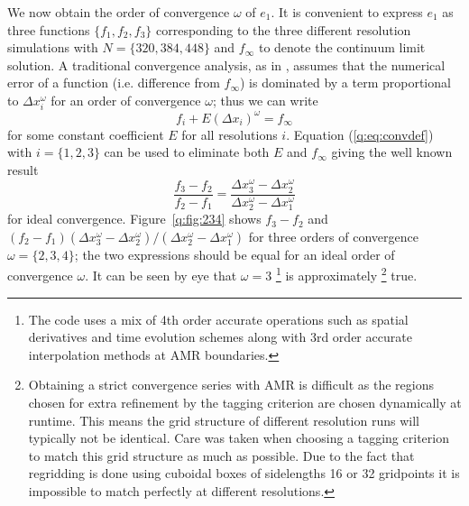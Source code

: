 We now obtain the order of convergence $\omega$ of $e_1$. It is convenient to express $e_1$ as three functions $\{f_1,f_2,f_3\}$ corresponding to the three different resolution simulations with $N=\{320,384,448\}$ and $f_\infty$ to denote the continuum limit solution. A traditional convergence analysis, as in \cite{PresTeukVettFlan92}, assumes that the numerical error of a function (i.e. difference from $f_\infty$) is dominated by a term proportional to $\Delta x_i^\omega$ for an order of convergence $\omega$; thus we can write
\begin{equation}\label{q:eq:convdef}f_i + E (\Delta x_i)^\omega = f_\infty\end{equation}
for some constant coefficient $E$ for all resolutions $i$. Equation (\ref{q:eq:convdef}) with $i=\{1,2,3\}$ can be used to eliminate both $E$ and $f_\infty$ giving the well known result
\begin{equation}
\label{q:eq:trad_conv_def}\frac{f_3-f_2}{f_2-f_1} = \frac{ \Delta x_3^\omega-\Delta x_2^\omega }{ \Delta x_2^\omega-\Delta x_1^\omega }
\end{equation}
for ideal convergence. Figure~\ref{q:fig:234} shows $f_3-f_2$ and
$(f_2-f_1 )(\Delta x_3^\omega - \Delta x_2^\omega)/(\Delta x_2^\omega - \Delta x_1^\omega)$
for three orders of convergence $\omega=\{2,3,4\}$; the two expressions should
be equal for an ideal order of convergence $\omega$. It can be seen by eye that
$\omega=3$
\footnote{\color{orchid} The code uses a mix of 4th order accurate operations such as spatial
derivatives and time evolution schemes along with 3rd order accurate interpolation
methods at AMR boundaries.} is approximately
\footnote{\color{orchid} Obtaining a strict convergence series with
AMR is difficult as the regions chosen for extra refinement by the tagging criterion
are chosen dynamically at runtime. This means the grid structure of different resolution
runs will typically not be identical. Care was taken when choosing a tagging criterion
to match this grid structure
as much as possible. Due to the fact that regridding is done using cuboidal boxes
of sidelengths 16 or 32 gridpoints it is impossible to match perfectly at different resolutions.}
true.
